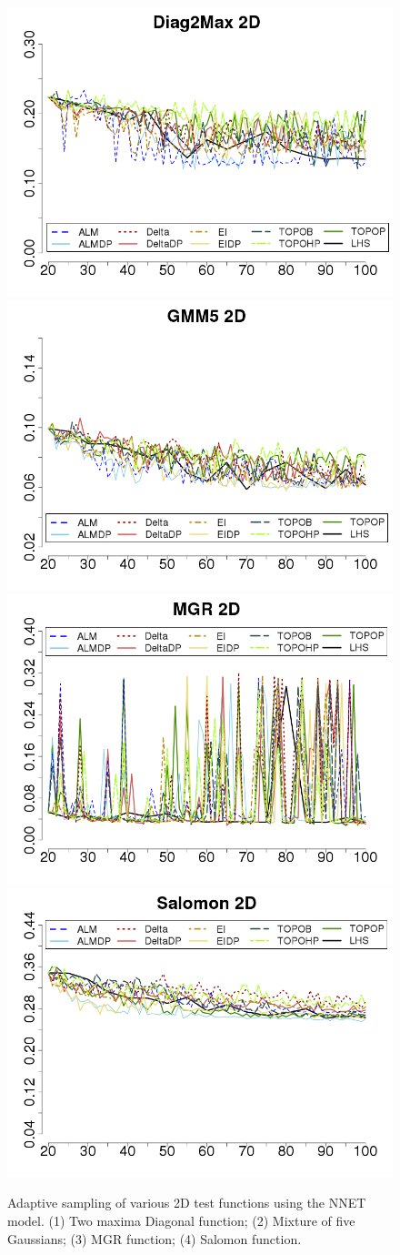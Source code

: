 \begin{figure}[htbp]
\begin{center}
  \includegraphics[width=0.48\linewidth]{figs/chap5/nnet_Diag2Max_td=20}\label{fig:2diag2D_nnet}
  \includegraphics[width=0.48\linewidth]{figs/chap5/nnet_GMM5_2D_td=20}\label{fig:gmm52D_nnet}
  \includegraphics[width=0.48\linewidth]{figs/chap5/nnet_MGR_td=20}\label{fig:mgr2D_nnet}
  \includegraphics[width=0.48\linewidth]{figs/chap5/nnet_Salomon_td=20}\label{fig:salomon2D_nnet}
\caption{Adaptive sampling of various 2D test functions using the NNET model.
(1) Two maxima Diagonal function;
(2) Mixture of five Gaussians; (3) MGR function;
(4) Salomon function.}
\label{fig:nnet_2D}
\end{center}
\end{figure}

